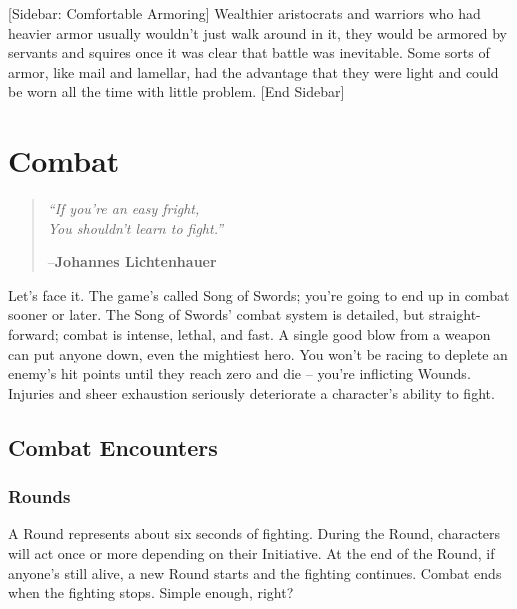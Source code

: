 \documentclass[oneside,11pt,english]{book}
\begin{document}
[Sidebar: Comfortable Armoring] 
Wealthier aristocrats and warriors who had heavier armor usually wouldn’t just walk around in it, they 
would be armored by servants and squires once it was clear that battle was inevitable. Some sorts of 
armor, like mail and lamellar, had the advantage that they were light and could be worn all the time with 
little problem. 
[End Sidebar] 


\chapter{Combat}\label{ch:combat}
\startcontents[chapters]
\clearpage
\begin{quote}
	\centering
		\emph{“If you’re an easy fright,\\
			You shouldn’t learn to fight.”}\par
		\hfill--\textbf{Johannes Lichtenhauer}
\end{quote}
Let’s face it. The game’s called Song of Swords; you’re going to end up in combat sooner or later. The Song of Swords’ combat system is detailed, but straight-forward; combat is intense, lethal, and fast. A
single good blow from a weapon can put anyone down, even the mightiest hero. You won’t be racing to
deplete an enemy’s hit points until they reach zero and die -- you’re inflicting Wounds. Injuries and sheer
exhaustion seriously deteriorate a character’s ability to fight.
\section{Combat Encounters}
\subsection{Rounds}
A Round represents about six seconds of fighting. During the Round, characters will act once or more
depending on their Initiative. At the end of the Round, if anyone’s still alive, a new Round starts and the
fighting continues. Combat ends when the fighting stops. Simple enough, right?
\end{document}
